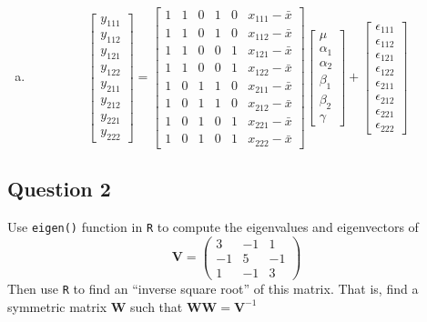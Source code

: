 \documentclass[paper=a4, fontsize=11pt]{scrartcl} %
\newcommand{\matV}{\mathbf{V}}
\newcommand{\matW}{\mathbf{W}}
\begin{document}
\begin{enumerate}[(a)]
\item 
$$
\begin{bmatrix} 
y_{1 1 1} \\ y_{1 1 2}\\ y_{1 2 1} \\ y_{1 2 2} \\ y_{2 1 1} \\y_{2 1 2} \\ y_{2 2 1} \\ y_{2 2 2} 
\end{bmatrix}
=
\begin{bmatrix} 1 & 1 & 0 & 1 & 0 & x_{111} - \bar x\\1 & 1 & 0 & 1 & 0 & x_{112} - \bar x\\1 & 1 & 0 & 0 & 1 & x_{121} - \bar x\\1 & 1 & 0 & 0 & 1  & x_{122} - \bar x\\1 & 0 & 1 & 1 & 0 & x_{211} - \bar x\\1 & 0 & 1 & 1 & 0 & x_{212} - \bar x\\1 & 0 & 1 & 0 & 1 & x_{221} - \bar x\\1 & 0 & 1 & 0 & 1 & x_{222} - \bar x\end{bmatrix}
\begin{bmatrix} 
\mu \\ \alpha_1\\ \alpha_2 \\ \beta_1 \\ \beta_2 \\ \gamma 
\end{bmatrix}
+ 
\begin{bmatrix} 
\epsilon_{1 1 1} \\ \epsilon_{1 1 2}\\ \epsilon_{1 2 1} \\ \epsilon_{1 2 2} \\ \epsilon_{2 1 1} \\ \epsilon_{2 1 2} \\ \epsilon_{2 2 1} \\ \epsilon_{2 2 2} 
\end{bmatrix}
$$

\end{enumerate}


\bigskip
\bigskip

\subsection*{Question 2}
Use \texttt{eigen()} function in \texttt{R} to compute the eigenvalues and eigenvectors of
$$
\matV = 
\left( \begin{array}{rrr}
  3 & -1 & 1 \\
  -1 & 5 & -1\\
  1 & -1 & 3
\end{array} \right)
$$
Then use \texttt{R} to find an ``inverse square root'' of this matrix.  That is, find a symmetric matrix $\mathbf{W}$
such that $\matW \matW= \matV^{-1}$
\end{document}
